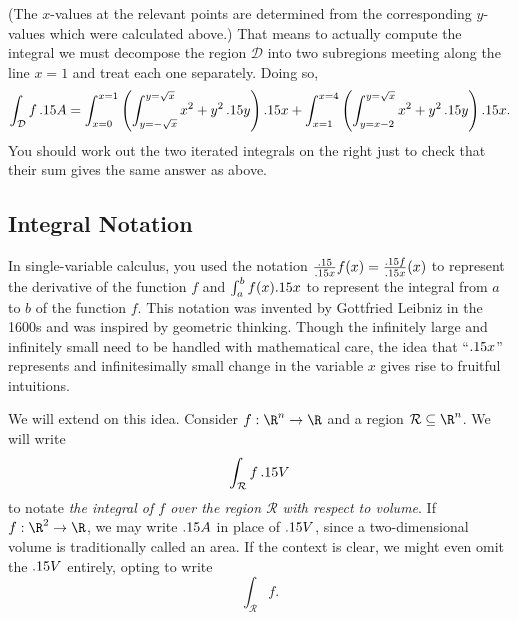 \begin{example}
\begin{center}
\end{center}

	(The $x$-values at the relevant points are determined from the corresponding
	$y$-values which were calculated above.)  That means to actually
	compute the integral we must decompose the region
	$\mathcal D$ into two subregions meeting along the line $x = 1$ and treat each
	one separately.   Doing so,
	\[
		\int_{\mathcal D} f\, .15 A
	=
	\int_{x=0}^{x=1}\left(\int_{y = -\sqrt x}^{y= \sqrt x} x^2 + y^2\, .15 y\right) .15 x 
	+
	\int_{x=1}^{x=4}\left(\int_{y = x-2}^{y= \sqrt x} x^2 + y^2\, .15 y\right) .15 x .
	\]
	You should work out the two iterated integrals on the right just to check
	that their sum gives the same answer as above.

\end{example}

\subsection{Integral Notation}

In single-variable calculus, you used the notation $\tfrac{.15}{.15 x}f(x)=\tfrac{.15 f}{.15 x}(x)$ 
to represent the derivative
of the function $f$ and $\int_{a}^b f(x).15 x$ to represent the integral from $a$ to $b$ of the function
$f$.  This notation was invented by Gottfried Leibniz in the 1600s and was inspired by geometric thinking.
Though the infinitely large and infinitely small need to be handled with mathematical care,
the idea that ``$.15 x$'' represents and infinitesimally small change in the variable $x$ gives
rise to fruitful intuitions.

We will extend on this idea.  Consider $f:\R^n\to\R$ and a region $\mathcal R\subseteq \R^n$.
We will write
\[
	\int_{\mathcal R} f\,.15 V
\]
to notate \emph{the integral of $f$ over the region $\mathcal R$ with respect to volume}.
If $f:\R^2\to\R$, we may write $.15 A$ in place of $.15 V$, since a two-dimensional volume
is traditionally called an area.  If the context is clear, we might even omit the $.15 V$
entirely, opting to write
\[
	\int_{\mathcal R} f.
\]

